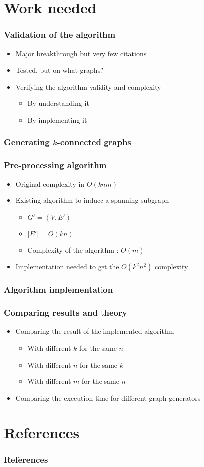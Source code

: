 \documentclass[xcolor=dvipsnames]{beamer}
\begin{document}
\section{Work needed}

\begin{frame}
  \frametitle{Validation of the algorithm}
  \begin{itemize}
  \item Major breakthrough but very few citations
  \item Tested, but on what graphs?
  \item Verifying the algorithm validity and complexity
    \begin{itemize}
    \item By understanding it
    \item By implementing it
    \end{itemize}
  \end{itemize}
\end{frame}

\begin{frame}
  \frametitle{Generating $k$-connected graphs}
\end{frame}

\begin{frame}
  \frametitle{Pre-processing algorithm}
  \begin{itemize}
  \item Original complexity in $O(k n m)$
  \item Existing algorithm to induce a spanning subgraph\cite{NaIb92}
    \begin{itemize}
    \item $G' = (V,E')$
    \item $|E'| = O(k n)$
    \item Complexity of the algorithm : $O(m)$
    \end{itemize}
  \item Implementation needed to get the $O(k^2 n^2)$ complexity
  \end{itemize}
\end{frame}

\begin{frame}
  \frametitle{Algorithm implementation}
\end{frame}

\begin{frame}
  \frametitle{Comparing results and theory}
  \begin{itemize}
  \item Comparing the result of the implemented algorithm
    \begin{itemize}
    \item With different $k$ for the same $n$
    \item With different $n$ for the same $k$
    \item With different $m$ for the same $n$
    \end{itemize}
  \item Comparing the execution time for different graph generators
  \end{itemize}
\end{frame}

\section*{References}
\begin{frame}[allowframebreaks]
  \frametitle{References}
  

  
\end{frame}
\end{document}
